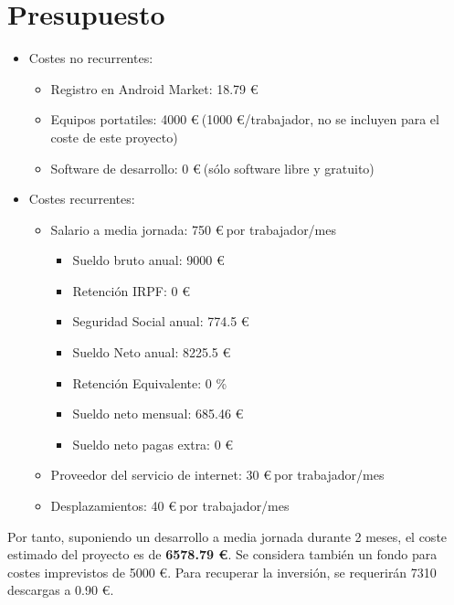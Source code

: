 \section{Presupuesto}

\begin{itemize}

  \item Costes no recurrentes:

  \begin{itemize}
    \item Registro en Android Market: 18.79 \euro
    \item Equipos portatiles: 4000 \euro$\ $(1000 \euro/trabajador, no se incluyen
      para el coste de este proyecto)
    \item Software de desarrollo: 0 \euro$\ $(sólo software libre y gratuito)
  \end{itemize}

  \item Costes recurrentes:

  \begin{itemize}

    \item Salario a media jornada: 750 \euro$\ $por trabajador/mes

    \begin{itemize}
      \item Sueldo bruto anual: 9000 \euro
      \item Retención IRPF: 0 \euro
      \item Seguridad Social anual: 774.5 \euro
      \item Sueldo Neto anual: 8225.5 \euro
      \item Retención Equivalente: 0 \%
      \item Sueldo neto mensual: 685.46 \euro
      \item Sueldo neto pagas extra: 0 \euro
    \end{itemize}

    \item Proveedor del servicio de internet: 30 \euro$\ $por trabajador/mes
    \item Desplazamientos: 40 \euro$\ $por trabajador/mes

  \end{itemize}

\end{itemize}

Por tanto, suponiendo un desarrollo a media jornada durante 2 meses, el coste
estimado del proyecto es de {\bf 6578.79 \euro}. Se considera también un fondo
para costes imprevistos de 5000 \euro. Para recuperar la inversión, se
requerirán 7310 descargas a 0.90 \euro.
